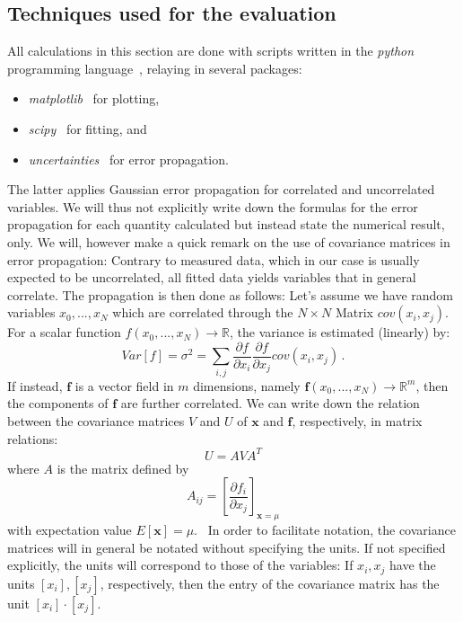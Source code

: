 \subsection{Techniques used for the evaluation}
All calculations in this section are done with scripts written in 
the \textit{python} programming language~\cite{python}, relaying in several 
packages:
\begin{itemize}
    \item
        \textit{matplotlib}~\cite{Hunter2007} for plotting,
    \item
        \textit{scipy}~\cite{scipy} for fitting, and 
    \item
        \textit{uncertainties}~\cite{uc} for error propagation.
\end{itemize}
The latter applies Gaussian error propagation for correlated and uncorrelated variables. 
We will thus not explicitly write down the formulas for the error propagation 
for each quantity calculated but instead state the numerical result, only. 
We will, however make a quick remark on the use of covariance matrices in 
error propagation: Contrary to measured data, which in our case is usually 
expected to be uncorrelated, all fitted data yields variables that in general correlate. 
The propagation is then done as follows:
Let's assume we have random
variables $x_0,...,x_N$ which are correlated through the $N\times N$ Matrix $cov(x_i,x_j)$.
For a scalar function $f(x_0,...,x_N) \rightarrow \mathbb{R}$, the variance is estimated (linearly) by:
\begin{equation}
Var[f] = \sigma^2 = \sum_{i,j} \frac{\partial f}{\partial x_i} \frac{\partial f}{\partial x_j} cov(x_i,x_j) \,.
\end{equation} 
If instead, $\mathbf{f}$ is a vector field in $m$ dimensions, namely 
$\mathbf{f}(x_0,...,x_N) \rightarrow \mathbb{R}^m$, then the components of $\mathbf{f}$ 
are further correlated. We can write down the relation between the covariance matrices $V$ and $U$ of 
$\mathbf{x}$ and $\mathbf{f}$, respectively, in matrix relations:
\begin{equation}
    U = A V A^T
\end{equation}
where $A$ is the matrix defined by 
\begin{equation}
    A_{ij} = \left[ \frac{\partial f_i}{\partial x_j}\right]_{\mathbf{x} = \mu}
\end{equation}
with expectation value $E[\mathbf{x}] = \mu$.~\cite{cowan1998statistical}
In order to facilitate notation, the covariance matrices will in general be notated without 
specifying the units. If not specified explicitly, the units will correspond to those of the
variables: If $x_i, x_j$ have the units $[x_i], [x_j]$, respectively, 
then the entry of the covariance matrix has the unit $[x_i] \cdot [x_j]$. 

